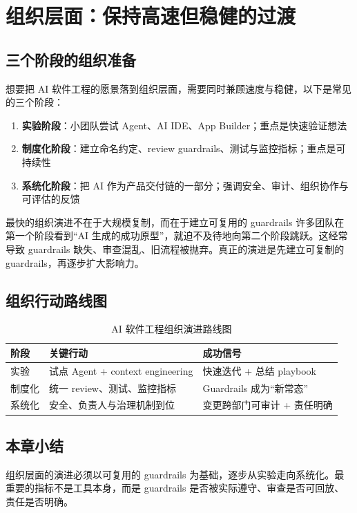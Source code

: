 \section{组织层面：保持高速但稳健的过渡}

\subsection{三个阶段的组织准备}

想要把 AI 软件工程的愿景落到组织层面，需要同时兼顾速度与稳健，以下是常见的三个阶段：

\begin{enumerate}
    \item \textbf{实验阶段}：小团队尝试 Agent、AI IDE、App Builder；重点是快速验证想法
    \item \textbf{制度化阶段}：建立命名约定、review guardrails、测试与监控指标；重点是可持续性
    \item \textbf{系统化阶段}：把 AI 作为产品交付链的一部分；强调安全、审计、组织协作与可评估的反馈
\end{enumerate}

\begin{importantbox}{最快的组织演进不在于大规模复制，而在于建立可复用的 guardrails}
许多团队在第一个阶段看到“AI 生成的成功原型”，就迫不及待地向第二个阶段跳跃。这经常导致 guardrails 缺失、审查混乱、旧流程被抛弃。真正的演进是先建立可复制的 guardrails，再逐步扩大影响力。
\end{importantbox}

\subsection{组织行动路线图}

\begin{table}[H]
\centering
\begin{tabular}{p{} p{} p{}}
\toprule
阶段 & 关键行动 & 成功信号 \\
\midrule
实验 & 试点 Agent + context engineering & 快速迭代 + 总结 playbook \\
制度化 & 统一 review、测试、监控指标 & Guardrails 成为“新常态” \\
系统化 & 安全、负责人与治理机制到位 & 变更跨部门可审计 + 责任明确 \\
\bottomrule
\end{tabular}
\caption{AI 软件工程组织演进路线图}
\end{table}

\subsection{本章小结}

组织层面的演进必须以可复用的 guardrails 为基础，逐步从实验走向系统化。最重要的指标不是工具本身，而是 guardrails 是否被实际遵守、审查是否可回放、责任是否明确。


